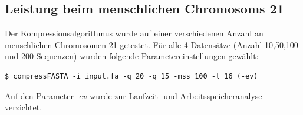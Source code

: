 \documentclass[12pt]{article}
\begin{document}
\subsection{Leistung beim menschlichen Chromosoms 21}
\begin{table}[t]
\footnotesize
{}
\caption{\label{tab:space}\emph{Übersicht des Ergebnisse für das menschliche Chromosom 21}. Alle Angaben, bis auf die erste Zeile mit der Anzahl an Sequenzen, sind in Megabyte. Die Bezeichnung \textit{Vorher} bezieht sich hierbei auf das Ergebnis vor den in Sektion \ref{sec:evepro} beschriebenen Verbesserungen: Auf Event-Ebene vor der Zusammenführung und auf Journaled String (JS)-Ebene vor der Prozessierung. Das Verhältnis (Ratio) bezieht sich jeweils auf die \textit{'Nachher'}-Werte zu den entsprechenden Rohdaten.}
\end{table}

Der Kompressionsalgorithmus wurde auf einer verschiedenen Anzahl an menschlichen Chromosomen 21 getestet. Für alle 4 Datensätze (Anzahl 10,50,100 und 200 Sequenzen) wurden folgende Parametereinstellungen gewählt:\\

\begin{lstlisting}[style=BashInputStyle]
    $ compressFASTA -i input.fa -q 20 -q 15 -mss 100 -t 16 (-ev)
\end{lstlisting}

Auf den Parameter -$ev$ wurde zur Laufzeit- und Arbeitsspeicheranalyse verzichtet. 
\end{document}
